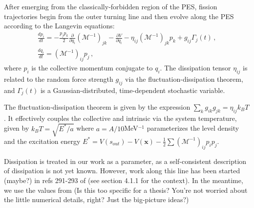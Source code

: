 After emerging from the classically-forbidden region of the PES, fission trajectories begin from the outer turning
line and then evolve along the PES according to the Langevin equations:
\begin{gather} 
	\frac{dp_i}{dt} =  
	-\frac{p_j p_k}{2} \frac{\partial}{\partial q_i}\left(\mathcal{M}^{-1}\right)_{jk} 
	- \frac{\partial V}{\partial q_i}  - \eta_{ij}\left(\mathcal{M}^{-1}\right)_{jk} p_k + g_{ij}\Gamma_j(t) \,, \\ 
	\frac{dq_i}{dt} = 	\left(\mathcal{M}^{-1}\right)_{ij} p_j \,,  
\end{gather} 
where $p_i$ is the collective momentum conjugate to $q_i$. The dissipation
tensor $\eta_{ij}$ is related to the random force strength $g_{ij}$ via the
fluctuation-dissipation theorem, and $\Gamma_j(t)$ is a Gaussian-distributed,
time-dependent stochastic variable.

The fluctuation-dissipation theorem is given by the expression $\sum_k g_{ik}g_{jk} = \eta_{ij}k_BT$. It effectively couples the collective and intrinsic via the system temperature, given by $k_BT = \sqrt{E^*/a}$ where $a=A/10$MeV$^{-1}$ parameterizes the level density and the excitation energy $E^* = V(s_{out}) - V(\mathbf{x}) - \frac{1}{2}\sum\left(\mathcal{M}^{-1}\right)_{ij}p_i p_j$.

Dissipation is treated in our work as a parameter, as a self-consistent description of dissipation is not yet known. However, work along this line has been started (maybe?) in refs 291-293 of \cite{Schmidt2018} (see section 4.1.1 for the context). In the meantime, we use the values from \cite{Sadhukhan2016} (Is this too specific for a thesis? You're not worried about the little numerical details, right? Just the big-picture ideas?)

